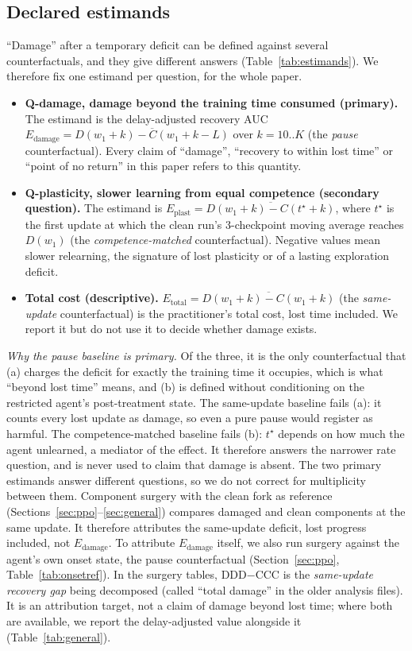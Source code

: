 \documentclass[10pt]{article} %
\begin{document}
\subsection{Declared estimands}\label{sec:estimands}
``Damage'' after a temporary deficit can be defined against several counterfactuals, and they give different answers (Table~\ref{tab:estimands}). We therefore fix one estimand per question, for the whole paper.
\begin{itemize}
\item \textbf{Q-damage, damage beyond the training time consumed (primary).} The estimand is the delay-adjusted recovery AUC $E_{\mathrm{damage}}=\overline{D(w_1+k)-C(w_1+k-L)}$ over $k=10..K$ (the \emph{pause} counterfactual). Every claim of ``damage'', ``recovery to within lost time'' or ``point of no return'' in this paper refers to this quantity.
\item \textbf{Q-plasticity, slower learning from equal competence (secondary question).} The estimand is $E_{\mathrm{plast}}=\overline{D(w_1+k)-C(t^\star+k)}$, where $t^\star$ is the first update at which the clean run's 3-checkpoint moving average reaches $D(w_1)$ (the \emph{competence-matched} counterfactual). Negative values mean slower relearning, the signature of lost plasticity or of a lasting exploration deficit.
\item \textbf{Total cost (descriptive).} $E_{\mathrm{total}}=\overline{D(w_1+k)-C(w_1+k)}$ (the \emph{same-update} counterfactual) is the practitioner's total cost, lost time included. We report it but do not use it to decide whether damage exists.
\end{itemize}
\emph{Why the pause baseline is primary.} Of the three, it is the only counterfactual that (a) charges the deficit for exactly the training time it occupies, which is what ``beyond lost time'' means, and (b) is defined without conditioning on the restricted agent's post-treatment state. The same-update baseline fails (a): it counts every lost update as damage, so even a pure pause would register as harmful. The competence-matched baseline fails (b): $t^\star$ depends on how much the agent unlearned, a mediator of the effect. It therefore answers the narrower rate question, and is never used to claim that damage is absent. The two primary estimands answer different questions, so we do not correct for multiplicity between them. Component surgery with the clean fork as reference (Sections~\ref{sec:ppo}--\ref{sec:general}) compares damaged and clean components at the same update. It therefore attributes the same-update deficit, lost progress included, not $E_{\mathrm{damage}}$. To attribute $E_{\mathrm{damage}}$ itself, we also run surgery against the agent's own onset state, the pause counterfactual (Section~\ref{sec:ppo}, Table~\ref{tab:onsetref}). In the surgery tables, DDD$-$CCC is the \emph{same-update recovery gap} being decomposed (called ``total damage'' in the older analysis files). It is an attribution target, not a claim of damage beyond lost time; where both are available, we report the delay-adjusted value alongside it (Table~\ref{tab:general}).
\end{document}
